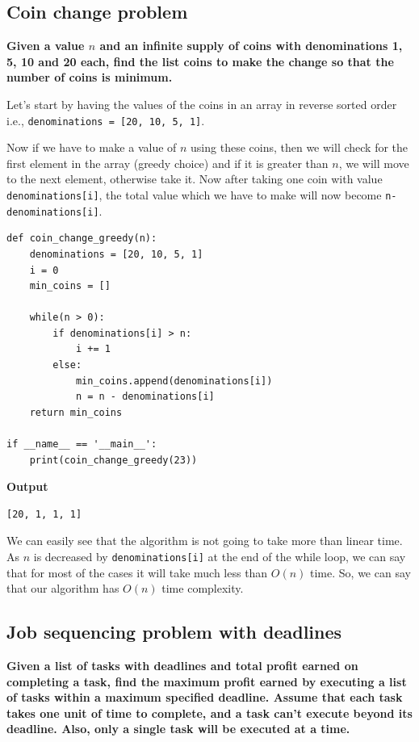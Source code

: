 \documentclass[a4paper,11pt]{book}
\begin{document}
\subsection{Coin change problem}

\noindent \textbf{Given a value $n$ and an infinite supply of coins with denominations 1, 5, 10 and 20 each, find the list coins to make the change so that the number of coins is minimum.}
\vspace{5mm}

\noindent Let's start by having the values of the coins in an array in reverse sorted order i.e., \lstinline{denominations = [20, 10, 5, 1]}.

\noindent Now if we have to make a value of $n$ using these coins, then we will check for the first element in the array (greedy choice) and if it is greater than $n$, we will move to the next element, otherwise take it. Now after taking one coin with value \lstinline{denominations[i]}, the total value which we have to make will now become \lstinline{n-denominations[i]}.

\begin{lstlisting}
def coin_change_greedy(n):
    denominations = [20, 10, 5, 1]
    i = 0
    min_coins = []

    while(n > 0):
        if denominations[i] > n:
            i += 1
        else:
            min_coins.append(denominations[i])
            n = n - denominations[i]
    return min_coins

if __name__ == '__main__':
    print(coin_change_greedy(23))
\end{lstlisting}
\textbf{Output}
\begin{lstlisting}
[20, 1, 1, 1]
\end{lstlisting}
\noindent We can easily see that the algorithm is not going to take more than linear time. As $n$ is decreased by \lstinline{denominations[i]} at the end of the while loop, we can say that for most of the cases it will take much less than $O(n)$ time. So, we can say that our algorithm has $O(n)$ time complexity.

\subsection{Job sequencing problem with deadlines}

\noindent \textbf{Given a list of tasks with deadlines and total profit earned on completing a task, find the maximum profit earned by executing a list of tasks within a maximum specified deadline. Assume that each task takes one unit of time to complete, and a task can't execute beyond its deadline. Also, only a single task will be executed at a time.}
\end{document}
